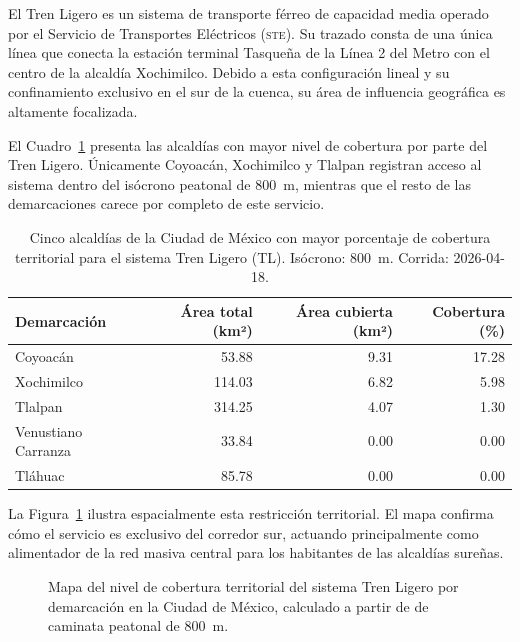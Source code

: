 El Tren Ligero es un sistema de transporte férreo de capacidad media operado por
el Servicio de Transportes Eléctricos (\textsc{ste}). Su trazado consta de una
única línea que conecta la estación terminal Tasqueña de la Línea 2 del Metro con
el centro de la alcaldía Xochimilco. Debido a esta configuración lineal y su
confinamiento exclusivo en el sur de la cuenca, su área de influencia geográfica
es altamente focalizada.

El Cuadro~\ref{tab:cobertura-tl-cdmx} presenta las alcaldías con mayor nivel de
cobertura por parte del Tren Ligero. Únicamente Coyoacán, Xochimilco y Tlalpan
registran acceso al sistema dentro del isócrono peatonal de 800~m, mientras que
el resto de las demarcaciones carece por completo de este servicio.

\begin{table}[H]
    \centering
    \caption[Alcaldías con mayor cobertura de Tren Ligero (CDMX)]{
    Cinco alcaldías de la Ciudad de México con mayor porcentaje de cobertura
    territorial para el sistema Tren Ligero (TL). Isócrono: 800~m.
    Corrida: 2026-04-18.}
    \label{tab:cobertura-tl-cdmx}
    \begin{tabular}{|l|r|r|r|}
        \hline
        \textbf{Demarcación} & \textbf{Área total (km²)} & \textbf{Área cubierta (km²)} & \textbf{Cobertura (\%)} \\
        \hline
        Coyoacán            &  53.88 & 9.31 &  17.28 \\
        Xochimilco          & 114.03 & 6.82 &   5.98 \\
        Tlalpan             & 314.25 & 4.07 &   1.30 \\
        Venustiano Carranza &  33.84 & 0.00 &   0.00 \\
        Tláhuac             &  85.78 & 0.00 &   0.00 \\
        \hline
    \end{tabular}
\end{table}

La Figura~\ref{fig:mapa-cobertura-tl} ilustra espacialmente esta restricción
territorial. El mapa confirma cómo el servicio es exclusivo del corredor sur,
actuando principalmente como alimentador de la red masiva central para los
habitantes de las alcaldías sureñas.

\begin{figure}[H]
    \centering
    \caption[Mapa de cobertura territorial del Tren Ligero en la CDMX]{Mapa del
    nivel de cobertura territorial del sistema Tren Ligero por demarcación en
    la Ciudad de México, calculado a partir de  de caminata
    peatonal de 800~m.}
    \label{fig:mapa-cobertura-tl}
\end{figure}

